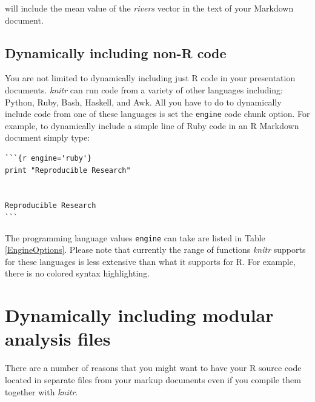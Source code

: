 \noindent will include the mean value of the {\emph{rivers}} vector in the text of your Markdown document.

\subsection{Dynamically including non-R code}

You are not limited to dynamically including just R code in your presentation documents. {\emph{knitr}} can run code from a variety of other languages including: Python, Ruby, Bash, Haskell, and Awk. All you have to do to dynamically include code from one of these languages is set the \texttt{engine} code chunk option. For example, to dynamically include a simple line of Ruby code in an R Markdown document simply type:

\begin{knitrout}
\color{fgcolor}\begin{kframe}
\begin{verbatim}
```{r engine='ruby'}
print "Reproducible Research"
 

Reproducible Research
```
\end{verbatim}
\end{kframe}
\end{knitrout}

The programming language values \texttt{engine} can take are listed in Table \ref{EngineOptions}. Please note that currently the range of functions {\emph{knitr}} supports for these languages is less extensive than what it supports for R. For example, there is no colored syntax highlighting.

\section{Dynamically including modular analysis files}

There are a number of reasons that you might want to have your R source code located in separate files from your markup documents even if you compile them together with {\emph{knitr}}.

